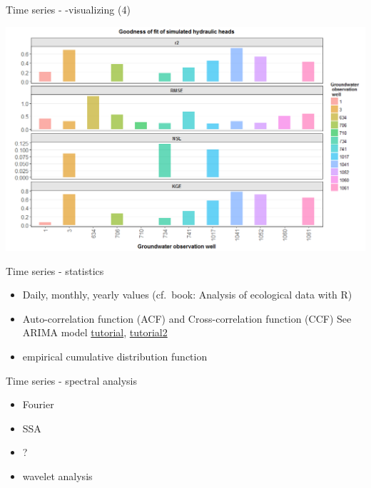 \documentclass[9pt,ignorenonframetext,]{beamer}
\providecommand{\tightlist}{%
  \setlength{\itemsep}{0pt}\setlength{\parskip}{0pt}}
\begin{document}
\begin{frame}{Time series - -visualizing (4)}

\includegraphics{imgPres/time_series_head_analysis04.png}

\end{frame}

\begin{frame}{Time series - statistics}

\begin{itemize}
\tightlist
\item
  Daily, monthly, yearly values (cf.~book: Analysis of ecological data
  with R)
\item
  Auto-correlation function (ACF) and Cross-correlation function (CCF)
  See ARIMA model
  \href{https://www.analyticsvidhya.com/blog/2015/12/complete-tutorial-time-series-modeling/}{tutorial},
  \href{http://a-little-book-of-r-for-time-series.readthedocs.io/en/latest/src/timeseries.html}{tutorial2}
\item
  empirical cumulative distribution function
\end{itemize}

\end{frame}

\begin{frame}{Time series - spectral analysis}

\begin{itemize}
\tightlist
\item
  Fourier
\item
  SSA
\item
  ?
\item
  wavelet analysis
\end{itemize}

\end{frame}
\end{document}
